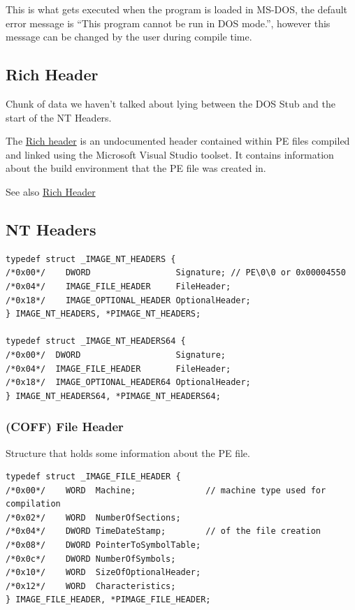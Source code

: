 This is what gets executed when the program is loaded in MS-DOS, the default error message is “This program cannot be run in DOS mode.”, however this message can be changed by the user during compile time.



\subsection{Rich Header}

Chunk of data we haven’t talked about lying between the DOS Stub and the start of the NT Headers.

The \href{https://github.com/RichHeaderResearch/RichPE}{Rich header} is an undocumented header contained within PE files compiled and linked using the Microsoft Visual Studio toolset. It contains information about the build environment that the PE file was created in.

See also \href{https://0xrick.github.io/win-internals/pe3/#rich-header}{Rich Header}

\subsection{NT Headers}

\begin{verbatim}
typedef struct _IMAGE_NT_HEADERS {
/*0x00*/    DWORD                 Signature; // PE\0\0 or 0x00004550
/*0x04*/    IMAGE_FILE_HEADER     FileHeader; 
/*0x18*/    IMAGE_OPTIONAL_HEADER OptionalHeader; 
} IMAGE_NT_HEADERS, *PIMAGE_NT_HEADERS;

typedef struct _IMAGE_NT_HEADERS64 {
/*0x00*/  DWORD                   Signature;
/*0x04*/  IMAGE_FILE_HEADER       FileHeader;
/*0x18*/  IMAGE_OPTIONAL_HEADER64 OptionalHeader;
} IMAGE_NT_HEADERS64, *PIMAGE_NT_HEADERS64;
\end{verbatim}

\subsubsection{(COFF) File Header}
Structure that holds some information about the PE file.

\begin{verbatim}
typedef struct _IMAGE_FILE_HEADER {
/*0x00*/    WORD  Machine;              // machine type used for compilation
/*0x02*/    WORD  NumberOfSections; 
/*0x04*/    DWORD TimeDateStamp;        // of the file creation  
/*0x08*/    DWORD PointerToSymbolTable;
/*0x0c*/    DWORD NumberOfSymbols;
/*0x10*/    WORD  SizeOfOptionalHeader;
/*0x12*/    WORD  Characteristics;
} IMAGE_FILE_HEADER, *PIMAGE_FILE_HEADER;
\end{verbatim}

